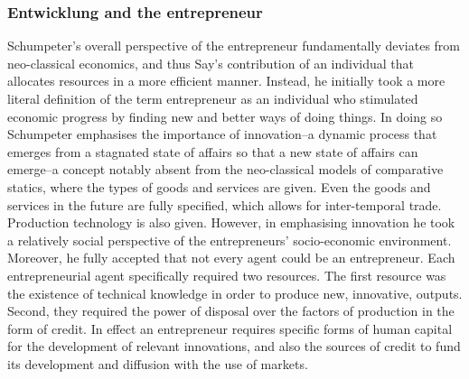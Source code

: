 \subsubsection{Entwicklung and the entrepreneur}

Schumpeter's overall perspective of the entrepreneur fundamentally deviates from neo-classical economics, and thus Say's contribution of an individual that allocates resources in a more efficient manner. Instead, he initially took a more literal definition of the term entrepreneur as an individual who stimulated economic progress by finding new and better ways of doing things. In doing so Schumpeter emphasises the importance of innovation--a dynamic process that emerges from a stagnated state of affairs so that a new state of affairs can emerge--a concept notably absent from the neo-classical models of comparative statics, where the types of goods and services are given. Even the goods and services in the future are fully specified, which allows for inter-temporal trade. Production technology is also given. However, in emphasising innovation he took a relatively social perspective of the entrepreneurs' socio-economic environment. Moreover, he fully accepted that not every agent could be an entrepreneur. Each entrepreneurial agent specifically required two resources. The first resource was the existence of technical knowledge in order to produce new, innovative, outputs. Second, they required the power of disposal over the factors of production in the form of credit. In effect an entrepreneur requires specific forms of human capital for the development of relevant innovations, and also the sources of credit to fund its development and diffusion with the use of markets.

